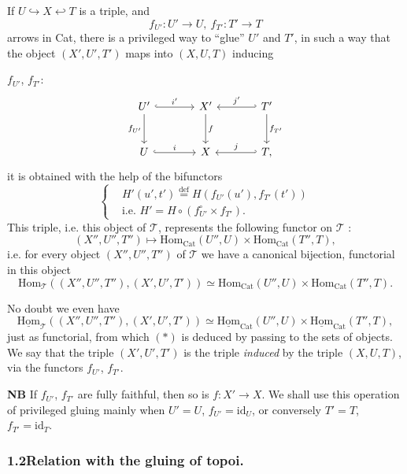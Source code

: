\documentclass[11pt]{article}
\newcommand{\printedpage}[1]{\marginpar{\footnotesize p.~#1}}
\newcommand{\msp}[1]{\marginpar{\footnotesize [#1]}}
\newcommand{\uHom}{\underline{\mathrm{Hom}}}
\begin{document}
If $U \hookrightarrow X \hookleftarrow T$ is a triple, and
\[
f_{U'} : U' \longrightarrow U,\ f_{T'} : T' \longrightarrow T
\]
arrows in Cat, there is a privileged way to ``glue'' $U'$ and $T'$, in such a way that the object $(X',U',T')$ maps into $(X,U,T)$ inducing

\msp{page 61}

$f_{U'}$, $f_{T'}$:
\[
\begin{tikzcd}[column sep=large, row sep=large]
U' \arrow[r, hook, "i'"] \arrow[d, "f_{U'}"'] & X' \arrow[d, "f"] & T' \arrow[l, hook', "j'"'] \arrow[d, "f_{T'}"] \\
U \arrow[r, hook, "i"] & X & T, \arrow[l, hook', "j"']
\end{tikzcd}
\]
it is obtained with the help of the bifunctors
\[
\left\{\begin{aligned}
&H'(u',t') \overset{\text{def}}{=} H(f_{U'}(u'), f_{T'}(t'))\\
&\text{i.e. } H' = H \circ (f_{U'}^\circ \times f_{T'}).
\end{aligned}\right.
\]
This triple, i.e. this object of $\mathcal{T}$, represents the following functor on $\mathcal{T}$ :
\[
(X'',U'',T'') \longmapsto \mathrm{Hom}_{\mathrm{Cat}}(U'',U) \times \mathrm{Hom}_{\mathrm{Cat}}(T'',T),
\]
i.e. for every object $(X'',U'',T'')$ of $\mathcal{T}$ we have a canonical bijection, functorial in this object
\[
\mathrm{Hom}_{\mathcal{T}}((X'',U'',T''),(X',U',T')) \simeq \mathrm{Hom}_{\mathrm{Cat}}(U'',U) \times \mathrm{Hom}_{\mathrm{Cat}}(T'',T). \tag*{$(*)$}
\]

\printedpage{45}

No doubt we even have
\[
\uHom_{\mathcal{T}}((X'',U'',T''),(X',U',T')) \simeq \uHom_{\mathrm{Cat}}(U'',U) \times \uHom_{\mathrm{Cat}}(T'',T), \tag*{$(**)$}
\]
just as functorial, from which $(*)$ is deduced by passing to the sets of objects. We say that the triple $(X',U',T')$ is the triple \textit{induced} by the triple $(X,U,T)$, via the functors $f_{U'}$, $f_{T'}$.

\textbf{NB} If $f_{U'}$, $f_{T'}$ are fully faithful, then so is $f : X' \longrightarrow X$. We shall use this operation of privileged gluing mainly when $U' = U$, $f_{U'} = \mathrm{id}_U$, or conversely $T' = T$, $f_{T'} = \mathrm{id}_T$.

\subsubsection*{1.2\quad Relation with the gluing of topoi.}
\end{document}
